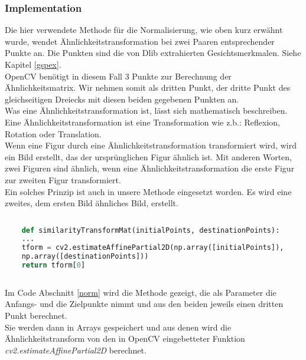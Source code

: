 \begin{flushleft}
	
	\subsubsection{Implementation}
	
	Die hier verwendete Methode für die Normalisierung, wie oben kurz erwähnt wurde,
	wendet
	Ähnlichkeitstransformation bei zwei Paaren entsprechender Punkte an.
	Die Punkten sind die von Dlib extrahierten Gesichtsmerkmalen. Siehe Kapitel
	\ref{gspex}.
	\\
	
	OpenCV benötigt in diesem Fall 3 Punkte zur Berechnung der Ähnlichkeitsmatrix.
	Wir nehmen somit als dritten Punkt, der dritte Punkt des gleichseitigen Dreiecks
	mit diesen beiden gegebenen Punkten an.
	\\
	
	Was eine Ähnlichkeitstransformation ist, lässt sich mathematisch beschreiben. 
	Eine Ähnlichkeitstransformation ist eine Transformation wie z.b.: Reflexion,
	Rotation oder Translation. 
	\\
	
	Wenn eine Figur durch eine Ähnlichkeitstransformation transformiert wird, wird
	ein Bild erstellt, das der ursprünglichen Figur ähnlich ist. Mit anderen Worten,
	zwei Figuren sind ähnlich, wenn eine Ähnlichkeitstransformation die erste Figur
	zur zweiten Figur transformiert.\\
	
	Ein solches Prinzip ist auch in unsere Methode eingesetzt worden. Es wird eine
	zweites, dem ersten Bild ähnliches Bild, erstellt. \\
	
	\begin{lstlisting}[caption=Implementation
	Normalisierung,language=python,label=norm]
	
	def similarityTransformMat(initialPoints, destinationPoints):
	...
	tform = cv2.estimateAffinePartial2D(np.array([initialPoints]),
	np.array([destinationPoints]))
	return tform[0]
	
	\end{lstlisting}
	
	Im Code Abschnitt \ref{norm} wird die Methode gezeigt, die als Parameter die
	Anfangs- und die Zielpunkte nimmt und aus den beiden jeweils einen dritten Punkt
	berechnet.
	\\
	
	Sie werden dann in Arrays gespeichert und aus denen wird die
	Ähnlichkeitstransform von den in OpenCV eingebetteter Funktion
	\textit{cv2.estimateAffinePartial2D} berechnet.
	\\
	

\end{flushleft}
